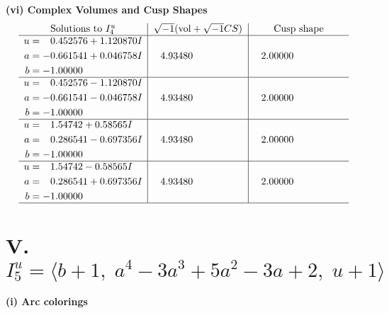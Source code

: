 \documentclass[1p]{elsarticle_modified}
\theoremstyle{definition}
\newcommand{\I}{\sqrt{-1}}
\begin{document}
\newpage\flushleft \textbf{(vi) Complex Volumes and Cusp Shapes}
$$\begin{array}{c|c|c}  
\text{Solutions to }I^u_{4}& \I (\text{vol} + \sqrt{-1}CS) & \text{Cusp shape}\\
 \hline 
\begin{aligned}
u &= \phantom{-}0.452576 + 1.120870 I \\
a &= -0.661541 + 0.046758 I \\
b &= -1.00000\phantom{ +0.000000I}\end{aligned}
 & \phantom{-}4.93480\phantom{ +0.000000I} & \phantom{-}2.00000\phantom{ +0.000000I} \\ \hline\begin{aligned}
u &= \phantom{-}0.452576 - 1.120870 I \\
a &= -0.661541 - 0.046758 I \\
b &= -1.00000\phantom{ +0.000000I}\end{aligned}
 & \phantom{-}4.93480\phantom{ +0.000000I} & \phantom{-}2.00000\phantom{ +0.000000I} \\ \hline\begin{aligned}
u &= \phantom{-}1.54742 + 0.58565 I \\
a &= \phantom{-}0.286541 - 0.697356 I \\
b &= -1.00000\phantom{ +0.000000I}\end{aligned}
 & \phantom{-}4.93480\phantom{ +0.000000I} & \phantom{-}2.00000\phantom{ +0.000000I} \\ \hline\begin{aligned}
u &= \phantom{-}1.54742 - 0.58565 I \\
a &= \phantom{-}0.286541 + 0.697356 I \\
b &= -1.00000\phantom{ +0.000000I}\end{aligned}
 & \phantom{-}4.93480\phantom{ +0.000000I} & \phantom{-}2.00000\phantom{ +0.000000I}\\
 \hline 
 \end{array}$$\newpage\newpage\renewcommand{\arraystretch}{1}
\centering \section*{V. $I^u_{5}= \langle b+1,\;a^4-3 a^3+5 a^2-3 a+2,\;u+1 \rangle$}
\flushleft \textbf{(i) Arc colorings}\\
\end{document}
